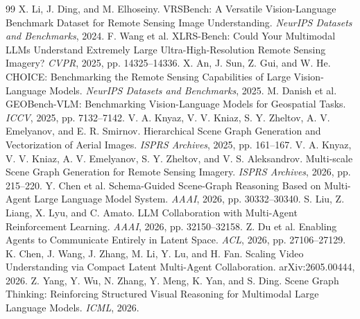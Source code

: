 \documentclass[10pt,a4paper,twocolumn]{ctexart}
\begin{document}
\balance
\begin{thebibliography}{99}
\small
{} X. Li, J. Ding, and M. Elhoseiny. VRSBench: A Versatile Vision-Language Benchmark Dataset for Remote Sensing Image Understanding. \textit{NeurIPS Datasets and Benchmarks}, 2024.
 F. Wang et al. XLRS-Bench: Could Your Multimodal LLMs Understand Extremely Large Ultra-High-Resolution Remote Sensing Imagery? \textit{CVPR}, 2025, pp. 14325--14336.
 X. An, J. Sun, Z. Gui, and W. He. CHOICE: Benchmarking the Remote Sensing Capabilities of Large Vision-Language Models. \textit{NeurIPS Datasets and Benchmarks}, 2025.
 M. Danish et al. GEOBench-VLM: Benchmarking Vision-Language Models for Geospatial Tasks. \textit{ICCV}, 2025, pp. 7132--7142.
 V. A. Knyaz, V. V. Kniaz, S. Y. Zheltov, A. V. Emelyanov, and E. R. Smirnov. Hierarchical Scene Graph Generation and Vectorization of Aerial Images. \textit{ISPRS Archives}, 2025, pp. 161--167.
 V. A. Knyaz, V. V. Kniaz, A. V. Emelyanov, S. Y. Zheltov, and V. S. Aleksandrov. Multi-scale Scene Graph Generation for Remote Sensing Imagery. \textit{ISPRS Archives}, 2026, pp. 215--220.
 Y. Chen et al. Schema-Guided Scene-Graph Reasoning Based on Multi-Agent Large Language Model System. \textit{AAAI}, 2026, pp. 30332--30340.
 S. Liu, Z. Liang, X. Lyu, and C. Amato. LLM Collaboration with Multi-Agent Reinforcement Learning. \textit{AAAI}, 2026, pp. 32150--32158.
 Z. Du et al. Enabling Agents to Communicate Entirely in Latent Space. \textit{ACL}, 2026, pp. 27106--27129.
 K. Chen, J. Wang, J. Zhang, M. Li, Y. Lu, and H. Fan. Scaling Video Understanding via Compact Latent Multi-Agent Collaboration. arXiv:2605.00444, 2026.
 Z. Yang, Y. Wu, N. Zhang, Y. Meng, K. Yan, and S. Ding. Scene Graph Thinking: Reinforcing Structured Visual Reasoning for Multimodal Large Language Models. \textit{ICML}, 2026.
\end{thebibliography}
\end{document}
